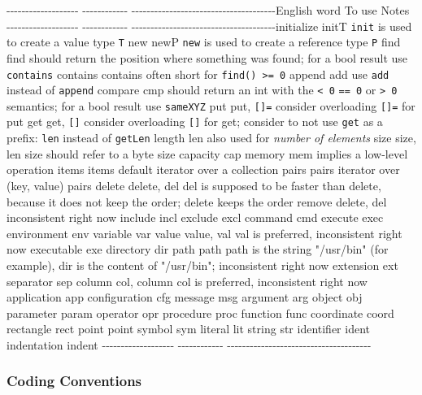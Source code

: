 -\/-\/-\/-\/-\/-\/-\/-\/-\/-\/-\/-\/-\/-\/-\/-\/-\/-\/-
-\/-\/-\/-\/-\/-\/-\/-\/-\/-\/-\/-
-\/-\/-\/-\/-\/-\/-\/-\/-\/-\/-\/-\/-\/-\/-\/-\/-\/-\/-\/-\/-\/-\/-\/-\/-\/-\/-\/-\/-\/-\/-\/-\/-\/-\/-\/-\/-\/-English
word To use Notes
-\/-\/-\/-\/-\/-\/-\/-\/-\/-\/-\/-\/-\/-\/-\/-\/-\/-\/-
-\/-\/-\/-\/-\/-\/-\/-\/-\/-\/-\/-
-\/-\/-\/-\/-\/-\/-\/-\/-\/-\/-\/-\/-\/-\/-\/-\/-\/-\/-\/-\/-\/-\/-\/-\/-\/-\/-\/-\/-\/-\/-\/-\/-\/-\/-\/-\/-\/-initialize
initT \texttt{init} is used to create a value type \texttt{T} new newP
\texttt{new} is used to create a reference type \texttt{P} find find
should return the position where something was found; for a bool result
use \texttt{contains} contains contains often short for
\texttt{find()\ \textgreater{}=\ 0} append add use \texttt{add} instead
of \texttt{append} compare cmp should return an int with the
\texttt{\textless{}\ 0} \texttt{==\ 0} or \texttt{\textgreater{}\ 0}
semantics; for a bool result use \texttt{sameXYZ} put put,
\texttt{{[}{]}=} consider overloading \texttt{{[}{]}=} for put get get,
\texttt{{[}{]}} consider overloading \texttt{{[}{]}} for get; consider
to not use \texttt{get} as a prefix: \texttt{len} instead of
\texttt{getLen} length len also used for \emph{number of elements} size
size, len size should refer to a byte size capacity cap memory mem
implies a low-level operation items items default iterator over a
collection pairs pairs iterator over (key, value) pairs delete delete,
del del is supposed to be faster than delete, because it does not keep
the order; delete keeps the order remove delete, del inconsistent right
now include incl exclude excl command cmd execute exec environment env
variable var value value, val val is preferred, inconsistent right now
executable exe directory dir path path path is the string "/usr/bin"
(for example), dir is the content of "/usr/bin"; inconsistent right now
extension ext separator sep column col, column col is preferred,
inconsistent right now application app configuration cfg message msg
argument arg object obj parameter param operator opr procedure proc
function func coordinate coord rectangle rect point point symbol sym
literal lit string str identifier ident indentation indent
-\/-\/-\/-\/-\/-\/-\/-\/-\/-\/-\/-\/-\/-\/-\/-\/-\/-\/-
-\/-\/-\/-\/-\/-\/-\/-\/-\/-\/-\/-
-\/-\/-\/-\/-\/-\/-\/-\/-\/-\/-\/-\/-\/-\/-\/-\/-\/-\/-\/-\/-\/-\/-\/-\/-\/-\/-\/-\/-\/-\/-\/-\/-\/-\/-\/-\/-\/-

\hypertarget{coding-conventions}{%
\subsubsection{Coding Conventions}\label{coding-conventions}}

